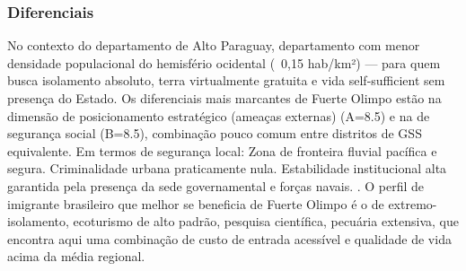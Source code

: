 \subsubsection*{Diferenciais}\label{dif-fuerte-olimpo-1701}
No contexto do departamento de Alto Paraguay, departamento com menor densidade populacional do hemisfério ocidental (~0,15 hab/km²) — para quem busca isolamento absoluto, terra virtualmente gratuita e vida self-sufficient sem presença do Estado. Os diferenciais mais marcantes de Fuerte Olimpo estão na dimensão de posicionamento estratégico (ameaças externas) (A=8.5) e na de segurança social (B=8.5), combinação pouco comum entre distritos de GSS equivalente. Em termos de segurança local: Zona de fronteira fluvial pacífica e segura. Criminalidade urbana praticamente nula. Estabilidade institucional alta garantida pela presença da sede governamental e forças navais. . O perfil de imigrante brasileiro que melhor se beneficia de Fuerte Olimpo é o de extremo-isolamento, ecoturismo de alto padrão, pesquisa científica, pecuária extensiva, que encontra aqui uma combinação de custo de entrada acessível e qualidade de vida acima da média regional.
